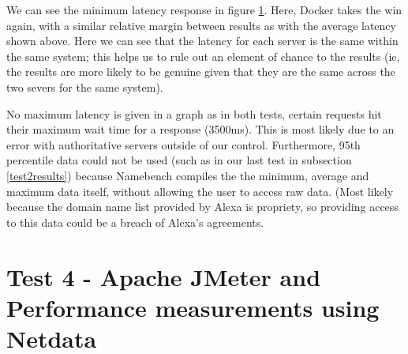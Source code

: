 We can see the minimum latency response in figure \ref{fig:test3graphmin}. Here, Docker takes the win again, with a similar relative margin between results as with the average latency shown above. Here we can see that the latency for each server is the same within the same system; this helps us to rule out an element of chance to the results (ie, the results are more likely to be genuine given that they are the same across the two severs for the same system).

\begin{figure}[H]
\caption{}
\label{fig:test3graphmin}
\centering
\end{figure}

No maximum latency is given in a graph as in both tests, certain requests hit their maximum wait time for a response (3500ms). This is most likely due to an error with authoritative servers outside of our control. Furthermore, 95th percentile data could not be used (such as in our last test in subsection \ref{test2results}) because Namebench compiles the the minimum, average and maximum data itself, without allowing the user to access raw data. (Most likely because the domain name list provided by Alexa \citep{alexainternet} is propriety, so providing access to this data could be a breach of Alexa's agreements.

\section{Test 4 - Apache JMeter and Performance measurements using Netdata}
